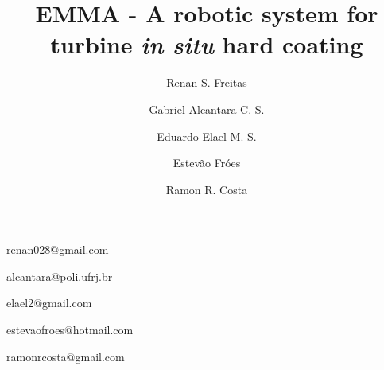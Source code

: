 \documentclass[conference,harvard,brazil,english]{sbatex}
\begin{document}
\title{EMMA - A robotic system for turbine \textit{in situ} hard
coating}

\author{Renan S. Freitas}{renan028@gmail.com}
\address{Department of Electrical Engineering, COPPE
UFRJ, Rio de Janeiro, Brasil.}

\author[1]{Gabriel Alcantara C. S.}{alcantara@poli.ufrj.br}
\author[1]{Eduardo Elael M. S.}{elael2@gmail.com}
\author[1]{Estevão Fróes}{estevaofroes@hotmail.com}
\author[1]{Ramon R. Costa}{ramonrcosta@gmail.com}





\end{document}
